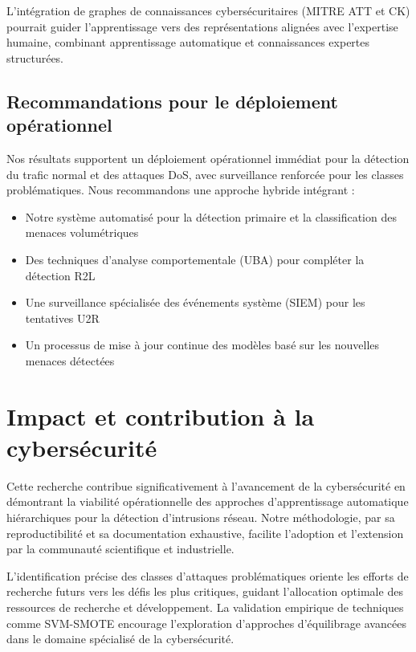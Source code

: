 L'intégration de graphes de connaissances cybersécuritaires (MITRE ATT et CK) pourrait guider l'apprentissage vers des représentations alignées avec l'expertise humaine, combinant apprentissage automatique et connaissances expertes structurées.

\subsection{Recommandations pour le déploiement opérationnel}

Nos résultats supportent un déploiement opérationnel immédiat pour la détection du trafic normal et des attaques DoS, avec surveillance renforcée pour les classes problématiques. Nous recommandons une approche hybride intégrant :

\begin{itemize}
    \item Notre système automatisé pour la détection primaire et la classification des menaces volumétriques
    \item Des techniques d'analyse comportementale (UBA) pour compléter la détection R2L
    \item Une surveillance spécialisée des événements système (SIEM) pour les tentatives U2R
    \item Un processus de mise à jour continue des modèles basé sur les nouvelles menaces détectées
\end{itemize}

\section{Impact et contribution à la cybersécurité}

Cette recherche contribue significativement à l'avancement de la cybersécurité en démontrant la viabilité opérationnelle des approches d'apprentissage automatique hiérarchiques pour la détection d'intrusions réseau. Notre méthodologie, par sa reproductibilité et sa documentation exhaustive, facilite l'adoption et l'extension par la communauté scientifique et industrielle.

L'identification précise des classes d'attaques problématiques oriente les efforts de recherche futurs vers les défis les plus critiques, guidant l'allocation optimale des ressources de recherche et développement. La validation empirique de techniques comme SVM-SMOTE encourage l'exploration d'approches d'équilibrage avancées dans le domaine spécialisé de la cybersécurité.

